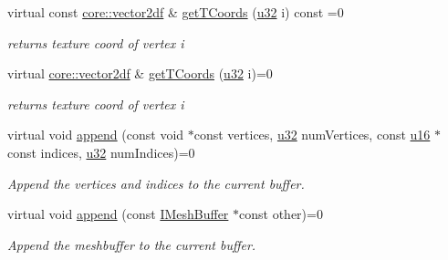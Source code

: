 \begin{DoxyCompactItemize}
\mbox{\label{classirr_1_1scene_1_1IMeshBuffer_a44e1fd7a1a3cb35492ebb556833514ed}} 
virtual const \hyperlink{namespaceirr_1_1core_a116f90bd31515724b6235014ee2b74d5}{core\+::vector2df} \& \hyperlink{classirr_1_1scene_1_1IMeshBuffer_a44e1fd7a1a3cb35492ebb556833514ed}{get\+T\+Coords} (\hyperlink{namespaceirr_a0416a53257075833e7002efd0a18e804}{u32} i) const =0
\begin{DoxyCompactList}\small\item\em returns texture coord of vertex i \end{DoxyCompactList}\item 
\mbox{\label{classirr_1_1scene_1_1IMeshBuffer_adf5f493e53fe6a23aa27c395527ea6ee}} 
virtual \hyperlink{namespaceirr_1_1core_a116f90bd31515724b6235014ee2b74d5}{core\+::vector2df} \& \hyperlink{classirr_1_1scene_1_1IMeshBuffer_adf5f493e53fe6a23aa27c395527ea6ee}{get\+T\+Coords} (\hyperlink{namespaceirr_a0416a53257075833e7002efd0a18e804}{u32} i)=0
\begin{DoxyCompactList}\small\item\em returns texture coord of vertex i \end{DoxyCompactList}\item 
virtual void \hyperlink{classirr_1_1scene_1_1IMeshBuffer_ac9e9d7fbb10175cc6f1596ba3fe4e8f9}{append} (const void $\ast$const vertices, \hyperlink{namespaceirr_a0416a53257075833e7002efd0a18e804}{u32} num\+Vertices, const \hyperlink{namespaceirr_ae9f8ec82692ad3b83c21f555bfa70bcc}{u16} $\ast$const indices, \hyperlink{namespaceirr_a0416a53257075833e7002efd0a18e804}{u32} num\+Indices)=0
\begin{DoxyCompactList}\small\item\em Append the vertices and indices to the current buffer. \end{DoxyCompactList}\item 
virtual void \hyperlink{classirr_1_1scene_1_1IMeshBuffer_a79d2737962579138183ed0fd324310b3}{append} (const \hyperlink{classirr_1_1scene_1_1IMeshBuffer}{I\+Mesh\+Buffer} $\ast$const other)=0
\begin{DoxyCompactList}\small\item\em Append the meshbuffer to the current buffer. \end{DoxyCompactList}\item 
\mbox{\label{classirr_1_1scene_1_1IMeshBuffer_abbf42191b2fb4d2f7094a77fd76a530e}} 

\end{DoxyCompactItemize}
